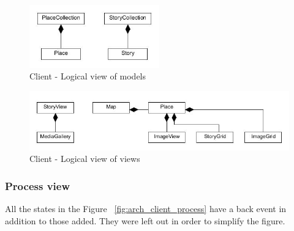 \documentclass[11pt]{book}
\begin{document}
\begin{figure}[H]
      \centering
      \includegraphics[width=0.5\textwidth]{Figures/Architecture/clientLogicalModels.jpg}
      \caption{Client - Logical view of models}
      \label{fig:arch_client_logical_models}
\end{figure}

\begin{figure}[H]
      \centering
      \includegraphics[width=1.0\textwidth]{Figures/Architecture/clientLogicalViews.jpg}
      \caption{Client - Logical view of views}
      \label{fig:arch_client_logical_views}
\end{figure}

\subsubsection{Process view}
All the states in the Figure ~\ref{fig:arch_client_process} have a back event in addition to those added. They were left out in order to simplify the figure.
\end{document}

